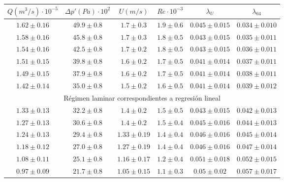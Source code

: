 \begin{table*}[t]
	\centering
		\begin{tabular}{cccccc}
			\toprule
$Q (m^3/s) \cdot 10^{-5}$   &   $\Delta p' (Pa) \cdot 10^2$   &   $U (m/s)$   &   $Re \cdot 10^{-3}$   &   $\lambda_U$   &   $\lambda_{64}$ \\
			\midrule
$1.62 \pm 0.16$   &   $49.9 \pm 0.8$   &   $1.7 \pm 0.3$   &   $1.9 \pm 0.6$   &   $0.045 \pm 0.015$   &   $0.034 \pm 0.010$  \\
$1.58 \pm 0.16$   &   $45.8 \pm 0.8$   &   $1.7 \pm 0.3$   &   $1.8 \pm 0.5$   &   $0.043 \pm 0.015$   &   $0.035 \pm 0.011$  \\
$1.54 \pm 0.16$   &   $42.5 \pm 0.8$   &   $1.7 \pm 0.2$   &   $1.8 \pm 0.5$   &   $0.043 \pm 0.015$   &   $0.036 \pm 0.011$  \\
$1.51 \pm 0.15$   &   $39.8 \pm 0.8$   &   $1.6 \pm 0.2$   &   $1.7 \pm 0.5$   &   $0.041 \pm 0.014$   &   $0.037 \pm 0.011$  \\
$1.49 \pm 0.15$   &   $37.9 \pm 0.8$   &   $1.6 \pm 0.2$   &   $1.7 \pm 0.5$   &   $0.041 \pm 0.014$   &   $0.038 \pm 0.011$  \\
$1.42 \pm 0.14$   &   $35.0 \pm 0.8$   &   $1.5 \pm 0.2$   &   $1.6 \pm 0.5$   &   $0.041 \pm 0.014$   &   $0.039 \pm 0.012$  \\
			\cmidrule(r){1-6}
			\multicolumn{6}{c}{Régimen laminar correspondientes a regresión lineal} \\
			\cmidrule(r){1-6}
$1.33 \pm 0.13$   &   $32.2 \pm 0.8$   &   $1.4 \pm 0.2$   &   $1.5 \pm 0.5$   &   $0.043 \pm 0.015$   &   $0.042 \pm 0.013$  \\
$1.27 \pm 0.13$   &   $30.6 \pm 0.8$   &   $1.4 \pm 0.2$   &   $1.5 \pm 0.4$   &   $0.045 \pm 0.016$   &   $0.044 \pm 0.013$  \\
$1.24 \pm 0.13$   &   $29.4 \pm 0.8$   &   $1.33 \pm 0.19$   &   $1.4 \pm 0.4$   &   $0.046 \pm 0.016$   &   $0.045 \pm 0.014$  \\
$1.18 \pm 0.12$   &   $27.0 \pm 0.8$   &   $1.27 \pm 0.19$   &   $1.4 \pm 0.4$   &   $0.046 \pm 0.016$   &   $0.047 \pm 0.014$  \\
$1.08 \pm 0.11$   &   $25.1 \pm 0.8$   &   $1.16 \pm 0.17$   &   $1.2 \pm 0.4$   &   $0.051 \pm 0.018$   &   $0.052 \pm 0.015$  \\
$0.97 \pm 0.09$   &   $21.7 \pm 0.8$   &   $1.05 \pm 0.15$   &   $1.1 \pm 0.3$   &   $0.05 \pm 0.02$   &   $0.057 \pm 0.017$  \\

\end{tabular}
\end{table*}
